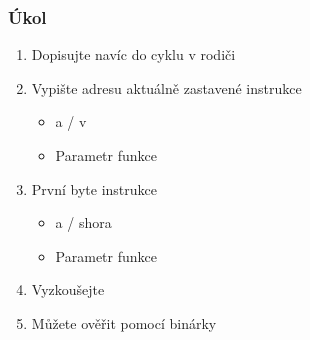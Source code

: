 \begin{frame}
  \frametitle{Úkol}

  \begin{enumerate}
    \item Dopisujte navíc do cyklu v rodiči

    \item Vypište adresu aktuálně zastavené instrukce
    \begin{itemize}
      \item {} a / v 
      \item Parametr  funkce 
    \end{itemize}

    \item První byte instrukce
    \begin{itemize}
      \item {} a / shora
      \item Parametr  funkce 
    \end{itemize}

    \item Vyzkoušejte
    \item Můžete ověřit pomocí  binárky
  \end{enumerate}

\end{frame}

